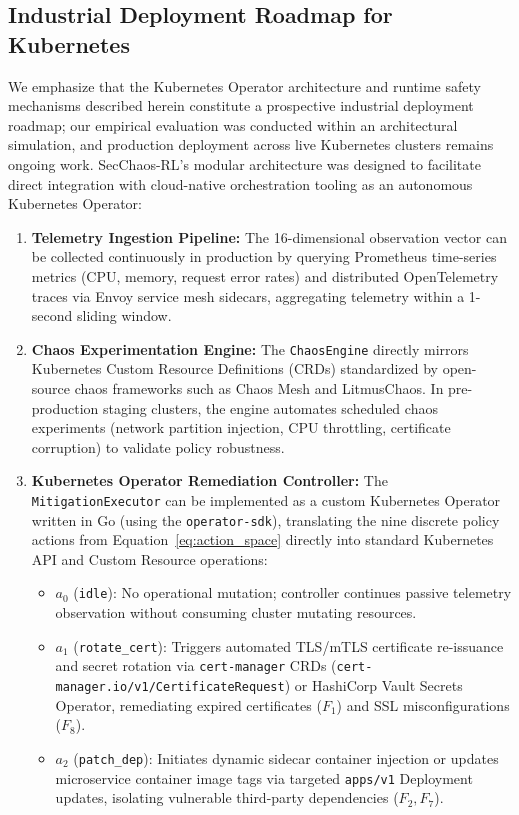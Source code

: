\documentclass[11pt,a4paper]{article}
\begin{document}
\subsection{Industrial Deployment Roadmap for Kubernetes}
We emphasize that the Kubernetes Operator architecture and runtime safety mechanisms described herein constitute a prospective industrial deployment roadmap; our empirical evaluation was conducted within an architectural simulation, and production deployment across live Kubernetes clusters remains ongoing work. SecChaos-RL's modular architecture was designed to facilitate direct integration with cloud-native orchestration tooling as an autonomous Kubernetes Operator:
\begin{enumerate}
    \item \textbf{Telemetry Ingestion Pipeline:} The 16-dimensional observation vector can be collected continuously in production by querying Prometheus time-series metrics (CPU, memory, request error rates) and distributed OpenTelemetry traces via Envoy service mesh sidecars, aggregating telemetry within a 1-second sliding window.
    \item \textbf{Chaos Experimentation Engine:} The \texttt{ChaosEngine} directly mirrors Kubernetes Custom Resource Definitions (CRDs) standardized by open-source chaos frameworks such as Chaos Mesh and LitmusChaos. In pre-production staging clusters, the engine automates scheduled chaos experiments (network partition injection, CPU throttling, certificate corruption) to validate policy robustness.
    \item \textbf{Kubernetes Operator Remediation Controller:} The \texttt{MitigationExecutor} can be implemented as a custom Kubernetes Operator written in Go (using the \texttt{operator-sdk}), translating the nine discrete policy actions from Equation~\eqref{eq:action_space} directly into standard Kubernetes API and Custom Resource operations:
    \begin{itemize}
        \item $a_0$ (\texttt{idle}): No operational mutation; controller continues passive telemetry observation without consuming cluster mutating resources.
        \item $a_1$ (\texttt{rotate\_cert}): Triggers automated TLS/mTLS certificate re-issuance and secret rotation via \texttt{cert-manager} CRDs (\texttt{cert-manager.io/v1/CertificateRequest}) or HashiCorp Vault Secrets Operator, remediating expired certificates ($F_1$) and SSL misconfigurations ($F_8$).
        \item $a_2$ (\texttt{patch\_dep}): Initiates dynamic sidecar container injection or updates microservice container image tags via targeted \texttt{apps/v1} Deployment updates, isolating vulnerable third-party dependencies ($F_2, F_7$).

\end{itemize}
\end{enumerate}
\end{document}
